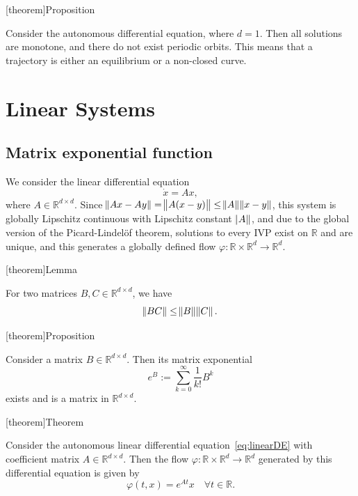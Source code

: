 \documentclass[12pt]{report}
\theoremstyle{definition}
\begin{document}
[theorem]{Proposition}
\begin{orbits of 1d DE}
    Consider the autonomous differential equation, where $d=1$.
    Then all solutions are monotone, and there do not exist periodic orbits.
    This means that a trajectory is either an equilibrium or a non-closed curve.
\end{orbits of 1d DE}


\chapter{Linear Systems}

\section{Matrix exponential function}

We consider the linear differential equation
\begin{equation}\label{eq:linearDE}
    \dot{x}=Ax,
\end{equation} 
where $A\in\mathbb{R}^{d\times d}$. Since
$\norm{Ax-Ay}=\norm{A(x-y)}\le\norm{A}\norm{x-y}$, this system
is globally Lipschitz continuous with Lipschitz constant $\norm{A}$, and due to
the global version of the Picard-Lindel\"{o}f theorem, solutions to every IVP
exist on $\mathbb{R}$ and are unique, and this generates a globally defined flow
$\varphi:\mathbb{R}\times\mathbb{R}^{d}\rightarrow\mathbb{R}^{d}$.

[theorem]{Lemma}
\begin{sub-multiplicativity of the matrix norm}
    For two matrices $B,C\in\mathbb{R}^{d\times d}$, we have
    \[
        \norm{BC}\le\norm{B}\norm{C}.
    \]
\end{sub-multiplicativity of the matrix norm}

[theorem]{Proposition}
\begin{existence of the matrix exponential}
    Consider a matrix $B\in\mathbb{R}^{d\times d}$. Then its matrix exponential
    \[
        e^{B}:=\sum_{k=0}^{\infty} \frac{1}{k!}B^{k}
    \]
    exists and is a matrix in $\mathbb{R}^{d\times d}$.
\end{existence of the matrix exponential}

[theorem]{Theorem}
\begin{the flow of an autonomous linear DE}
    Consider the autonomous linear differential equation~\eqref{eq:linearDE}
    with coefficient matrix $A\in\mathbb{R}^{d\times d}$. Then the flow
    $\varphi:\mathbb{R}\times\mathbb{R}^{d}\rightarrow\mathbb{R}^{d}$
    generated by this differential equation is given by
    \[
        \varphi(t,x)=e^{At}x\quad\forall t\in\mathbb{R}.
    \]
\end{the flow of an autonomous linear DE}
\end{document}
